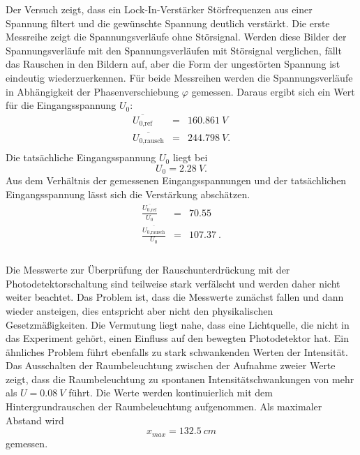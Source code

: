 Der Versuch zeigt, dass ein Lock-In-Verstärker Störfrequenzen aus einer Spannung filtert und die gewünschte Spannung deutlich verstärkt.
Die erste Messreihe zeigt die Spannungsverläufe ohne Störsignal.
Werden diese Bilder der Spannungsverläufe mit den Spannungsverläufen mit Störsignal verglichen, fällt das Rauschen in den Bildern auf, aber die Form der ungestörten Spannung ist eindeutig wiederzuerkennen.
Für beide Messreihen werden die Spannungsverläufe in Abhängigkeit der Phasenverschiebung $\varphi$ gemessen.
Daraus ergibt sich ein Wert für die Eingangsspannung $U_{0}$:
\begin{align*}
  \overline{U_{\text{0,ref}}}    &=& \SI{160.861}{V}\\
  \overline{U_{\text{0,rausch}}} &=& \SI{244.798}{V}.\\
\end{align*}
Die tatsächliche Eingangsspannung $U_{0}$ liegt bei
\begin{equation*}
  U_{0}=\SI{2.28}{V}.
\end{equation*}
Aus dem Verhältnis der gemessenen Eingangsspannungen und der tatsächlichen Eingangsspannung lässt sich die Verstärkung abschätzen.
\begin{align*}
  \frac{  \overline{U_{\text{0,ref}}     }}{U_{0}} &=& \SI{ 70.55}{}\\
  \frac{  \overline{U_{\text{0,rausch}}  }}{U_{0}} &=& \SI{107.37}{}.\\
\end{align*}
\\Die Messwerte zur Überprüfung der Rauschunterdrückung mit der Photodetektorschaltung sind teilweise stark verfälscht und werden daher nicht weiter beachtet.
Das Problem ist, dass die Messwerte zunächst fallen und dann wieder ansteigen, dies entspricht aber nicht den physikalischen Gesetzmäßigkeiten.
Die Vermutung liegt nahe, dass eine Lichtquelle, die nicht in das Experiment gehört, einen Einfluss auf den bewegten Photodetektor hat.
Ein ähnliches Problem führt ebenfalls zu stark schwankenden Werten der Intensität.
Das Ausschalten der Raumbeleuchtung zwischen der Aufnahme zweier Werte zeigt, dass die Raumbeleuchtung zu spontanen Intensitätschwankungen von mehr als $U=\SI{0.08}{V}$ führt.
Die Werte werden kontinuierlich mit dem Hintergrundrauschen der Raumbeleuchtung aufgenommen.
Als maximaler Abstand wird
\begin{equation*}
  x_{max}=\SI{132.5}{cm}
\end{equation*}
gemessen.
